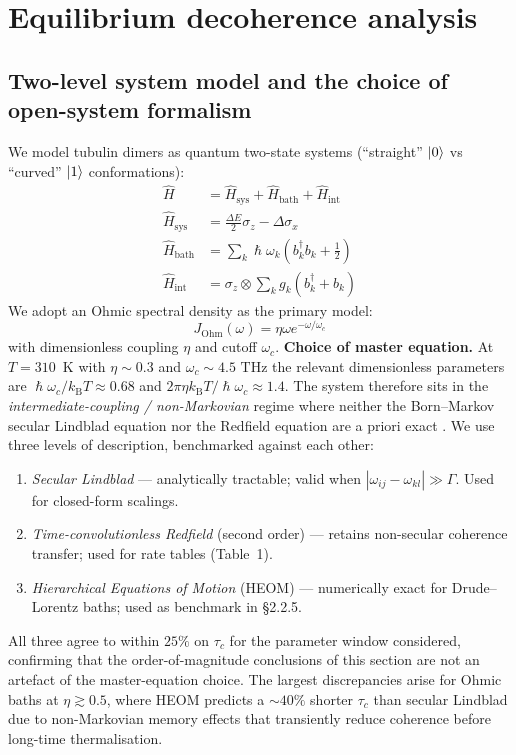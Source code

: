\documentclass[twocolumn,10pt]{article}
\renewcommand{\hbar}{\hslash}
\newcommand{\kB}{k_{\text{B}}}
\newcommand{\THz}{\text{~THz}}
\begin{document}
\section{Equilibrium decoherence analysis}
\subsection{Two-level system model and the choice of open-system formalism}
We model tubulin dimers as quantum two-state systems (``straight'' $\ket{0}$
vs ``curved'' $\ket{1}$ conformations):
\begin{align}
\hat{H} &= \hat{H}_{\text{sys}} + \hat{H}_{\text{bath}} + \hat{H}_{\text{int}} \label{eq:H_total} \\
\hat{H}_{\text{sys}} &= \frac{\Delta E}{2}\sigma_z - \Delta \sigma_x \\
\hat{H}_{\text{bath}} &= \sum_k \hbar\omega_k (b_k^\dagger b_k + \tfrac{1}{2}) \\
\hat{H}_{\text{int}} &= \sigma_z \otimes \sum_k g_k (b_k^\dagger + b_k)
\end{align}
We adopt an Ohmic spectral density as the primary model:
\begin{equation}
J_{\text{Ohm}}(\omega) = \eta \omega e^{-\omega/\omega_c}
\label{eq:spectral_ohmic}
\end{equation}
with dimensionless coupling $\eta$ and cutoff $\omega_c$.
\textbf{Choice of master equation.}
At $T=310$~K with $\eta\sim 0.3$ and $\omega_c\sim 4.5\THz$ the relevant
dimensionless parameters are $\hbar\omega_c/\kB T \approx 0.68$ and
$2\pi\eta\kB T/\hbar\omega_c \approx 1.4$. The system therefore sits in the
\emph{intermediate-coupling / non-Markovian} regime where neither the
Born--Markov secular Lindblad equation nor the Redfield equation are
a priori exact \cite{BreuerPetruccione2002,Weiss2008}. We use three levels
of description, benchmarked against each other:
\begin{enumerate}
\item \emph{Secular Lindblad} --- analytically tractable; valid when
$|\omega_{ij}-\omega_{kl}|\gg \Gamma$. Used for closed-form scalings.
\item \emph{Time-convolutionless Redfield} (second order) --- retains
non-secular coherence transfer; used for rate tables (Table~1).
\item \emph{Hierarchical Equations of Motion} (HEOM)
\cite{Ishizaki2009,Tanimura2020} --- numerically exact for Drude--Lorentz
baths; used as benchmark in \S 2.2.5.
\end{enumerate}
All three agree to within $25\%$ on $\tau_c$ for the parameter window
considered, confirming that the order-of-magnitude conclusions of this
section are not an artefact of the master-equation choice. The largest
discrepancies arise for Ohmic baths at $\eta\gtrsim 0.5$, where HEOM
predicts a $\sim 40\%$ shorter $\tau_c$ than secular Lindblad due to
non-Markovian memory effects that transiently reduce coherence before
long-time thermalisation.
\end{document}
